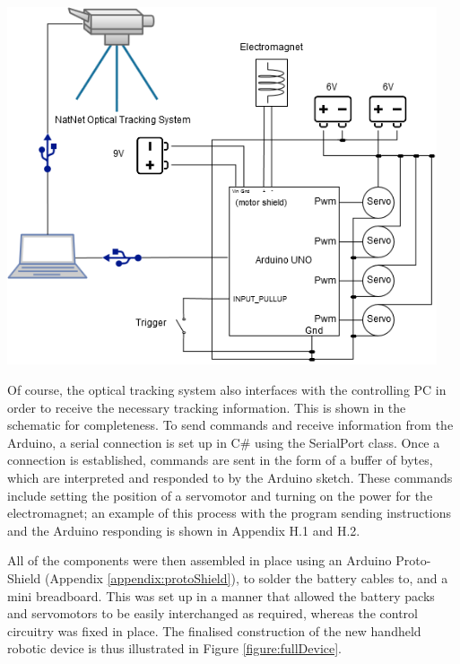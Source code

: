 \documentclass[11pt]{article}
\begin{document}
\begin{center}
\includegraphics[width=0.95\textwidth]{images/newSchematic.png}
\label{figure:schematic}
\end{center}

Of course, the optical tracking system also interfaces with the controlling PC in order to receive the necessary tracking information. This is shown in the schematic for completeness. To send commands and receive information from the Arduino, a serial connection is set up in C\# using the SerialPort class. Once a connection is established, commands are sent in the form of a buffer of bytes, which are interpreted and responded to by the Arduino sketch. These commands include setting the position of a servomotor and turning on the power for the electromagnet; an example of this process with the program sending instructions and the Arduino responding is shown in Appendix H.1 and H.2.

All of the components were then assembled in place using an Arduino Proto-Shield (Appendix \ref{appendix:protoShield}), to solder the battery cables to, and a mini breadboard. This was set up in a manner that allowed the battery packs and servomotors to be easily interchanged as required, whereas the control circuitry was fixed in place. The finalised construction of the new handheld robotic device is thus illustrated in Figure \ref{figure:fullDevice}.
\end{document}
